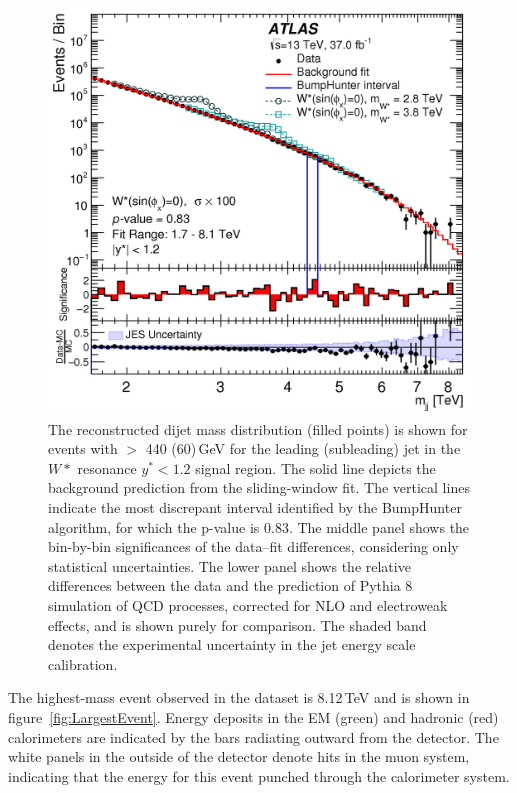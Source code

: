 \begin{figure}[]
	\centering
	\includegraphics[width=0.8\columnwidth]{figures/Results/Figure2.png}
	\caption{ The reconstructed dijet mass distribution \mjj (filled points) is shown for events with \pt $>$ 440 (60)\,GeV for the leading (subleading) jet in the $W*$ resonance $y^*<1.2$ signal region. The solid line depicts the background prediction from the sliding-window fit. The vertical lines indicate the most discrepant interval identified by the BumpHunter algorithm, for which the p-value is 0.83. The middle panel shows the bin-by-bin significances of the data–fit differences, considering only statistical uncertainties. The lower panel shows the relative differences between the data and the prediction of Pythia 8 simulation of QCD processes, corrected for NLO and electroweak effects, and is shown purely for comparison. The shaded band denotes the experimental uncertainty in the jet energy scale calibration.}
	\label{fig:Figure2}
\end{figure}

The highest-mass event observed in the dataset is 8.12\,TeV and is shown in figure~\ref{fig:LargestEvent}.  Energy deposits in the EM (green) and hadronic (red) calorimeters are indicated by the bars radiating outward from the detector.  The white panels in the outside of the detector denote hits in the muon system, indicating that the energy for this event punched through the calorimeter system.


